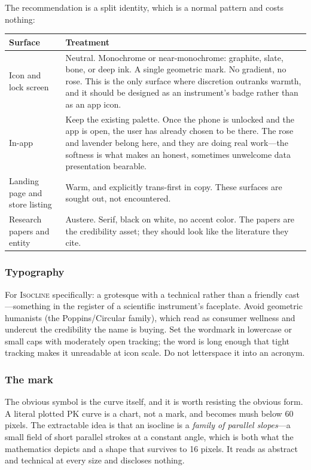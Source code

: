 \documentclass[11pt,a4paper]{article}
\newcommand{\good}[1]{#1}
\newcommand{\name}[1]{\textsc{#1}}
\begin{document}
The recommendation is a split identity, which is a normal pattern and
costs nothing:

\begin{longtable}{@{}L{3.4cm}L{11.7cm}@{}}
\toprule
\textbf{Surface} & \textbf{Treatment} \\
\midrule
\endhead
Icon and lock screen &
\good{Neutral.} Monochrome or near-monochrome: graphite, slate,
bone, or deep ink. A single geometric mark. No gradient, no rose. This
is the only surface where discretion outranks warmth, and it should be
designed as an instrument's badge rather than as an app icon. \\[0.4em]
In-app &
\good{Keep the existing palette.} Once the phone is unlocked and the
app is open, the user has already chosen to be there. The rose and
lavender belong here, and they are doing real work---the softness is
what makes an honest, sometimes unwelcome data presentation bearable. \\[0.4em]
Landing page and store listing &
Warm, and explicitly trans-first in copy. These surfaces are sought
out, not encountered. \\[0.4em]
Research papers and entity &
\good{Austere.} Serif, black on white, no accent color. The papers are
the credibility asset; they should look like the literature they cite. \\
\bottomrule
\end{longtable}

\subsubsection*{Typography}

For \name{Isocline} specifically: a grotesque with a technical rather
than a friendly cast---something in the register of a scientific
instrument's faceplate. Avoid geometric humanists (the Poppins/Circular
family), which read as consumer wellness and undercut the credibility
the name is buying. Set the wordmark in lowercase or small caps with
moderately open tracking; the word is long enough that tight tracking
makes it unreadable at icon scale. Do not letterspace it into an
acronym.

\subsubsection*{The mark}

The obvious symbol is the curve itself, and it is worth resisting the
obvious form. A literal plotted PK curve is a chart, not a mark, and
becomes mush below 60 pixels. The extractable idea is that an isocline
is a \emph{family of parallel slopes}---a small field of short parallel
strokes at a constant angle, which is both what the mathematics
depicts and a shape that survives to 16 pixels. It reads as abstract
and technical at every size and discloses nothing.
\end{document}
